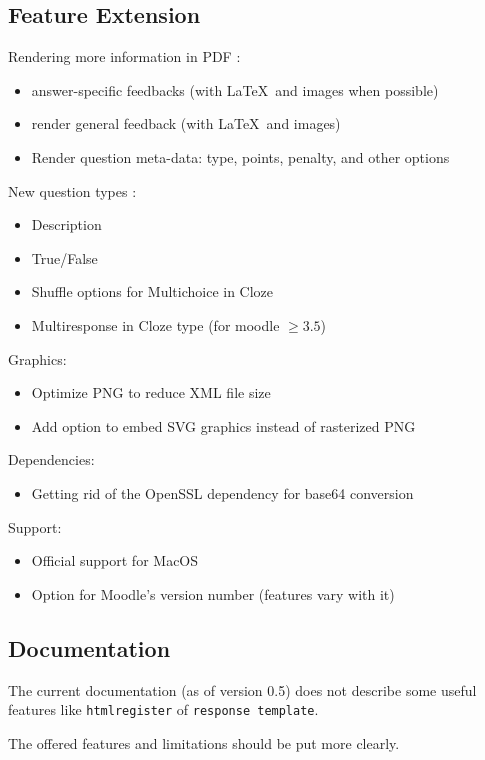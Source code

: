 \documentclass[twocolumn,a4paper,9pt]{article}
\begin{document}
\subsection{Feature Extension}

Rendering more information in PDF :
\begin{itemize}
	\item answer-specific feedbacks (with \LaTeX\ and images when possible)
	\item render general feedback (with \LaTeX\ and images)
	\item Render question meta-data: type, points, penalty, and other options
\end{itemize}

New question types :
\begin{itemize}
	\item Description
	\item True/False
	\item Shuffle options for Multichoice in Cloze
	\item Multiresponse in Cloze type (for moodle $\geq 3.5$)
\end{itemize}

Graphics:
\begin{itemize}
	\item Optimize PNG to reduce XML file size
	\item Add option to embed SVG graphics instead of rasterized PNG
\end{itemize}

Dependencies:
\begin{itemize}
	\item Getting rid of the OpenSSL dependency for base64 conversion
\end{itemize}

Support:
\begin{itemize}
	\item Official support for MacOS
	\item Option for Moodle's version number (features vary with it)
\end{itemize}

\subsection{Documentation}

The current documentation (as of version 0.5) does not describe some useful 
features like \texttt{htmlregister} of \texttt{response template}.

The offered features and limitations should be put more clearly.
\end{document}

